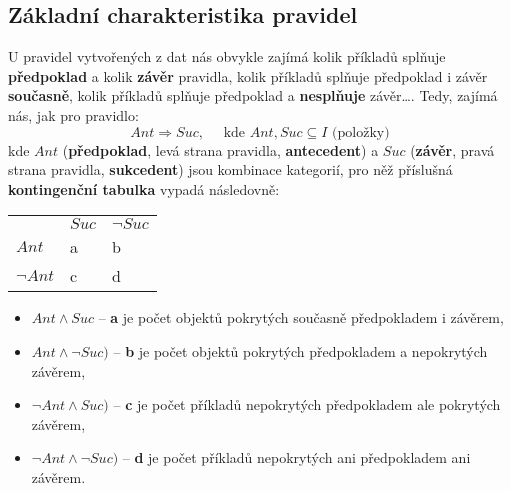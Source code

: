 \subsection{Základní charakteristika pravidel}
U pravidel vytvořených z dat nás obvykle zajímá kolik příkladů splňuje \textbf{předpoklad} a kolik \textbf{závěr} pravidla, kolik příkladů splňuje předpoklad i závěr \textbf{současně}, kolik příkladů splňuje předpoklad a \textbf{nesplňuje} závěr…. Tedy, zajímá nás, jak pro pravidlo:
\begin{equation}
    Ant \Rightarrow Suc, \quad\textrm{ kde } Ant, Suc \subseteq I \textrm{ (položky)}
\end{equation}
kde $ Ant $ (\textbf{předpoklad}, levá strana pravidla, \textbf{antecedent}) a $ Suc $ (\textbf{závěr}, pravá strana pravidla, \textbf{sukcedent}) jsou kombinace kategorií, pro něž příslušná \textbf{kontingenční tabulka} vypadá následovně:
\begin{table}[H]
    \centering
    \begin{tabular}{l|ll}
                     & $ Suc $ & $ \neg Suc $ \\\hhline
        $ Ant $      & a       & b            \\
        $ \neg Ant $ & c       & d
    \end{tabular}
\end{table}
\begin{itemize}
    \item $Ant \land Suc$ -- \textbf{a} je počet objektů {pokrytých současně předpokladem i závěrem},
    \item $Ant \land \neg Suc)$ -- \textbf{b} je počet objektů {pokrytých předpokladem a nepokrytých závěrem},
    \item $\neg Ant \land Suc)$ -- \textbf{c} je počet příkladů {nepokrytých předpokladem ale pokrytých závěrem},
    \item $\neg Ant \land \neg Suc)$ -- \textbf{d} je počet příkladů {nepokrytých ani předpokladem ani závěrem}.
\end{itemize}

